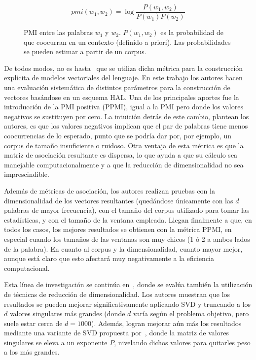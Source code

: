 \begin{figure}[h]
  \[
    pmi(w_1, w_2) = \log \frac{P(w_1, w_2)}{P(w_1) P(w_2)}
  \]
  \caption{PMI entre las palabras $w_1$ y $w_2$. $P(w_1, w_2)$ es la probabilidad de que coocurran
en un contexto (definido a priori). Las probabilidades se pueden estimar a partir de un corpus.}
  \label{eqn:pmi}
\end{figure}

De todos modos, no es hasta~\cite{BullinariaLevy2007} que se utiliza dicha métrica para la
construcción explícita de modelos vectoriales del lenguaje. En este trabajo los autores hacen una
evaluación sistemática de distintos parámetros para la construcción de vectores basándose en un
esquema HAL\@. Una de los principales aportes fue la introducción de la PMI positiva (PPMI), igual a
la PMI pero donde los valores negativos se sustituyen por cero. La intuición detrás de este cambio,
plantean los autores, es que los valores negativos implican que el par de palabras tiene menos
coocurrencias de lo esperado, punto que se podría dar por, por ejemplo, un corpus de tamaño
insuficiente o ruidoso. Otra ventaja de esta métrica es que la matriz de asociación resultante es
dispersa, lo que ayuda a que su cálculo sea manejable computacionalmente y a que la reducción de
dimensionalidad no sea imprescindible.

Además de métricas de asociación, los autores realizan pruebas con la dimensionalidad de los
vectores resultantes (quedándose únicamente con las $d$ palabras de mayor frecuencia), con el tamaño
del corpus utilizado para tomar las estadísticas, y con el tamaño de la ventana empleada. Llegan
finalmente a que, en todos los casos, los mejores resultados se obtienen con la métrica PPMI, en
especial cuando los tamaños de las ventanas son muy chicos (1 ó 2 a ambos lados de la palabra). En
cuanto al corpus y la dimensionalidad, cuanto mayor mejor, aunque está claro que esto afectará muy
negativamente a la eficiencia computacional.

Esta línea de investigación se continúa en~\cite{BullinariaLevy2012}, donde se evalúa también la
utilización de técnicas de reducción de dimensionalidad. Los autores muestran que los resultados se
pueden mejorar significativamente aplicando SVD y truncando a los $d$ valores singulares más grandes
(donde $d$ varía según el problema objetivo, pero suele estar cerca de $d = 1000$).  Además, logran
mejorar aún más los resultados mediante una variante de SVD propuesta por~\cite{Caron2001}, donde
la matriz de valores singulares se eleva a un exponente $P$, nivelando dichos valores para quitarles
peso a los más grandes.


